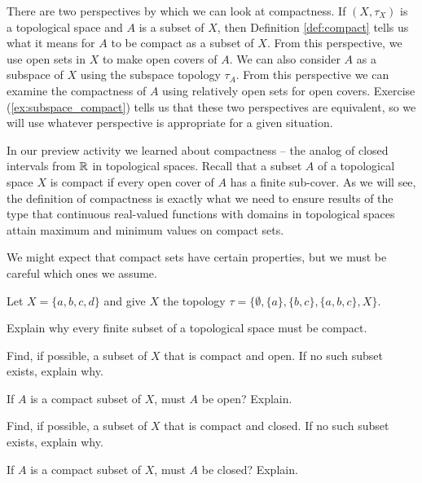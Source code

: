 There are two perspectives by which we can look at compactness. If $(X,\tau_X)$ is a topological space and $A$ is a subset of $X$, then Definition \ref{def:compact} tells us what it means for $A$ to be compact as a subset of $X$. From this perspective, we use open sets in $X$ to make open covers of $A$. We can also consider $A$ as a subspace of $X$ using the subspace topology $\tau_A$. From this perspective we can examine the compactness of $A$ using relatively open sets for open covers. Exercise (\ref{ex:subspace_compact}) tells us that these two perspectives are equivalent, so we will use whatever perspective is appropriate for a given situation. 



In our preview activity we learned about compactness -- the analog of closed intervals from $\mathbb{R}$ in topological spaces. Recall that a subset $A$ of a topological space $X$ is compact if every open cover of $A$ has a finite sub-cover. As we will see, the definition of compactness is exactly what we need to ensure results of the type that continuous real-valued functions with domains in topological spaces attain maximum and minimum values on compact sets. 

We might expect that compact sets have certain properties, but we must be careful which ones we assume.

\begin{activity} \label{act:compact_clopen} Let $X = \{a,b,c,d\}$ and give $X$ the topology $\tau = \{\emptyset, \{a\}, \{b,c\}, \{a,b,c\}, X\}$. 
\ba
\item Explain why every finite subset of a topological space must be compact. 

\item Find, if possible, a subset of $X$ that is compact and open. If no such subset exists, explain why.

\item If $A$ is a compact subset of $X$, must $A$ be open? Explain.

\item Find, if possible, a subset of $X$ that is compact and closed. If no such subset exists, explain why.

\item If $A$ is a compact subset of $X$, must $A$ be closed? Explain.

\ea

\end{activity}

